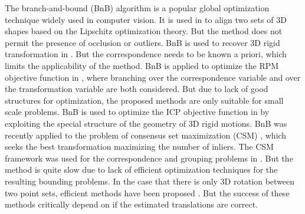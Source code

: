 \documentclass[11pt,bezier,]{article}
\begin{document}
The branch-and-bound (BnB) algorithm is a popular global optimization technique widely used in computer vision.
It is used in \cite{Lipschitz_3D_align} to align two sets of 3D shapes
based on the Lipschitz optimization theory.
But the method does not permit the presence of occlusion or outliers. 
BnB is used to recover 3D rigid transformation in \cite{branch_bound_align}.
But the 
correspondence needs to be known a priori,
which limits the applicability  of the method.
BnB is applied to optimize the RPM objective function in \cite{B_B_RPM},
where branching over the correspondence variable 
and over the transformation variable are both considered.
But due to lack of good  structures for optimization,
the proposed methods are only suitable for small scale problems. 
BnB is used to optimize the ICP objective function in \cite{Go-ICP}
by exploiting the special structure of the geometry of 3D rigid motions. %
BnB was recently  applied to  the problem of  
consensus set maximization (CSM) \cite{BnB_consensus_integer},
which seeks the best transformation maximizing the number of inliers.
The CSM framework was used for the correspondence and grouping problems 
in \cite{BnB_consensus_group}.
But 
the method is quite slow due to lack of efficient optimization techniques 
for the resulting bounding problems.
In the case that there is only 3D rotation between two point sets,
efficient methods have been proposed \cite{BnB_consensus_rotate,BnB_consensus_project}.
But the success of these methods critically depend on if the estimated translations are correct.
\end{document}
